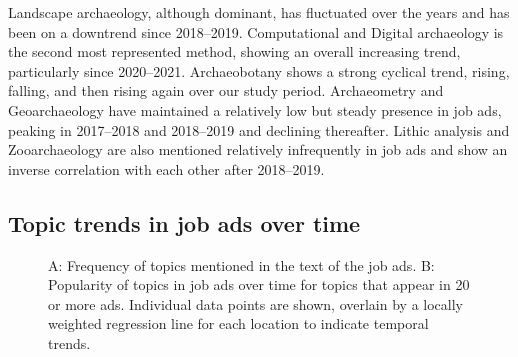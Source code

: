 \documentclass[
  12pt,
]{article}
\begin{document}
Landscape archaeology, although dominant, has fluctuated over the years
and has been on a downtrend since 2018--2019. Computational and Digital
archaeology is the second most represented method, showing an overall
increasing trend, particularly since 2020--2021. Archaeobotany shows a
strong cyclical trend, rising, falling, and then rising again over our
study period. Archaeometry and Geoarchaeology have maintained a
relatively low but steady presence in job ads, peaking in 2017--2018 and
2018--2019 and declining thereafter. Lithic analysis and Zooarchaeology
are also mentioned relatively infrequently in job ads and show an
inverse correlation with each other after 2018--2019.

\subsection{Topic trends in job ads over
time}\label{topic-trends-in-job-ads-over-time}

\begin{figure}


\caption{\label{fig-show-topi-trends}A: Frequency of topics mentioned in
the text of the job ads. B: Popularity of topics in job ads over time
for topics that appear in 20 or more ads. Individual data points are
shown, overlain by a locally weighted regression line for each location
to indicate temporal trends.}

\end{figure}%
\end{document}
